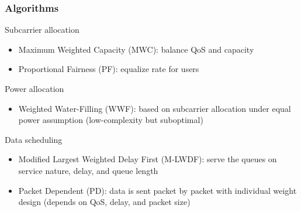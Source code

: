 \documentclass{beamer}
\begin{document}
\begin{frame}
\frametitle{Algorithms}

\begin{block}{Subcarrier allocation}
\begin{itemize}
  \item Maximum Weighted Capacity (MWC): balance QoS and capacity
  \item Proportional Fairness (PF): equalize rate for users
\end{itemize}
\end{block}

\begin{block}{Power allocation}
\begin{itemize}
  \item Weighted Water-Filling (WWF): based on subcarrier allocation under equal power assumption (low-complexity but suboptimal)
\end{itemize}
\end{block}

\begin{block}{Data scheduling}
\begin{itemize}
  \item Modified Largest Weighted Delay First (M-LWDF): serve the queues on service nature, delay, and queue length
  \item Packet Dependent (PD): data is sent packet by packet with individual weight design (depends on QoS, delay, and packet size)
\end{itemize}
\end{block}

\end{frame}
\end{document}
